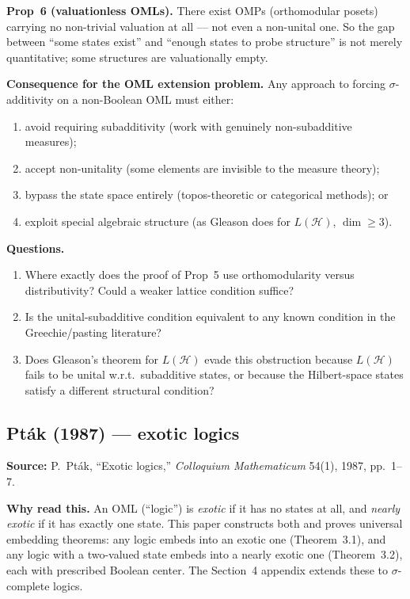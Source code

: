 \textbf{Prop~6 (valuationless OMLs).}  There exist OMPs (orthomodular
posets) carrying no non-trivial valuation at all --- not even a
non-unital one.  So the gap between ``some states exist'' and ``enough
states to probe structure'' is not merely quantitative; some structures
are valuationally empty.

\textbf{Consequence for the OML extension problem.}  Any approach to
forcing $\sigma$-additivity on a non-Boolean OML must either:
\begin{enumerate}[nosep]
  \item avoid requiring subadditivity (work with genuinely
    non-subadditive measures);
  \item accept non-unitality (some elements are invisible to the
    measure theory);
  \item bypass the state space entirely (topos-theoretic or
    categorical methods); or
  \item exploit special algebraic structure (as Gleason does for
    $L(\mathcal{H})$, $\dim \geq 3$).
\end{enumerate}

\textbf{Questions.}

\begin{enumerate}[nosep]
  \item Where exactly does the proof of Prop~5 use orthomodularity
    versus distributivity?  Could a weaker lattice condition suffice?
  \item Is the unital-subadditive condition equivalent to any
    known condition in the Greechie/pasting literature?
  \item Does Gleason's theorem for $L(\mathcal{H})$ evade this
    obstruction because $L(\mathcal{H})$ fails to be unital w.r.t.\
    subadditive states, or because the Hilbert-space states satisfy
    a different structural condition?
\end{enumerate}

\subsection*{Pt\'{a}k (1987) --- exotic logics}

\textbf{Source:} P.\ Pt\'{a}k, ``Exotic logics,''
\emph{Colloquium Mathematicum} 54(1), 1987, pp.~1--7.

\textbf{Why read this.}  An OML (``logic'') is \emph{exotic} if it has
no states at all, and \emph{nearly exotic} if it has exactly one state.
This paper constructs both and proves universal embedding theorems:
any logic embeds into an exotic one (Theorem~3.1), and any logic with
a two-valued state embeds into a nearly exotic one (Theorem~3.2),
each with prescribed Boolean center.  The Section~4 appendix extends
these to $\sigma$-complete logics.

